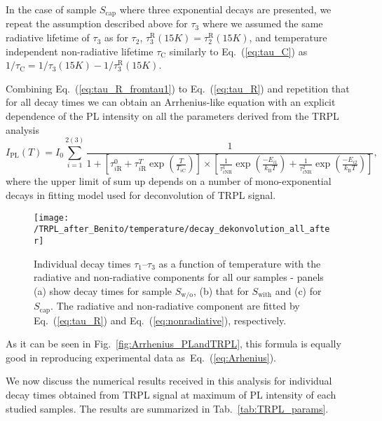 In the case of sample $S_\mathrm{cap}$ where three exponential decays are presented, we repeat the assumption described above for $\tau_3$ where we assumed the same radiative lifetime of $\tau_3$ as for $\tau_2$, $\tau_3^\mathrm{R}(15K)=\tau_2^\mathrm{R}(15K)$, and temperature independent non-radiative lifetime $\tau_\mathrm{C}$ similarly to Eq.~(\ref{eq:tau_C}) as $1 / \tau_\mathrm{C} = 1/ \tau_3(15K)-1/ \tau_3^\mathrm{R}(15K)$.

Combining Eq.~(\ref{eq:tau_R_fromtau1}) to Eq.~(\ref{eq:tau_R}) and repetition that for all decay times we can obtain an Arrhenius-like equation with an explicit dependence of the PL intensity on all the parameters derived from the TRPL analysis
%
\begin{equation}
I_\mathrm{PL}(T)=I_0\sum_{i=1}^{2(3)}\frac{1}{1+\left[\tau_{i\mathrm{R}}^0+\tau_{i\mathrm{R}}^T\exp{\left(\frac{T}{T_{i\mathrm{C}}}\right)}\right] \times \left[\frac{1}{\tau_{i\mathrm{NR}}^1}\exp{\left(\frac{-E_{i1}}{k_\mathrm{B}T}\right)} + \frac{1}{\tau_{i\mathrm{NR}}^2}\exp{\left(\frac{-E_{i2}}{k_\mathrm{B}T}\right)}\right]}, \label{eq:TRPL_Arhenius}
\end{equation}
%
where the upper limit of sum up depends on a number of mono-exponential decays in fitting model used for deconvolution of TRPL signal.
\begin{figure}
	\centering
	\texttt{[image: /TRPL\_after\_Benito/temperature/decay\_dekonvolution\_all\_after]}
	\caption{Individual decay times $\tau_1$--$\tau_3$ as a function of temperature with the radiative and non-radiative components for all our samples - panels (a) show decay times for sample $S_\mathrm{w/o}$, (b) that for $S_\mathrm{with}$ and (c) for $S_\mathrm{cap}$. The radiative and non-radiative component are fitted by Eq.~(\ref{eq:tau_R}) and Eq.~(\ref{eq:nonradiative}), respectively.}
	\label{fig:TRPL_temp_decon}
\end{figure}

As it can be seen in Fig.~\ref{fig:Arrhenius_PLandTRPL}, this formula is equally good in reproducing experimental data as~Eq.~(\ref{eq:Arhenius}). 


\newpage

We now discuss the numerical results received in this analysis for individual decay times obtained from TRPL signal at maximum of PL intensity of each studied samples. The results are summarized in Tab.~\ref{tab:TRPL_params}. 

